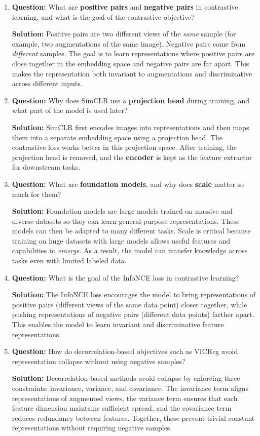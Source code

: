 \documentclass{article}
\begin{document}
\begin{enumerate}
\item \textbf{Question:} 
What are \textbf{positive pairs} and \textbf{negative pairs} in contrastive learning, and what is the goal of the contrastive objective?

\textbf{Solution:}  
Positive pairs are two different views of the \emph{same} sample (for example, two augmentations of the same image). Negative pairs come from \emph{different} samples.  
The goal is to learn representations where positive pairs are close together in the embedding space and negative pairs are far apart. This makes the representation both invariant to augmentations and discriminative across different inputs.

\item \textbf{Question:} 
Why does SimCLR use a \textbf{projection head} during training, and what part of the model is used later?

\textbf{Solution:}  
SimCLR first encodes images into representations and then maps them into a separate embedding space using a projection head. The contrastive loss works better in this projection space.  
After training, the projection head is removed, and the \textbf{encoder} is kept as the feature extractor for downstream tasks.

\item \textbf{Question:} 
What are \textbf{foundation models}, and why does \textbf{scale} matter so much for them?

\textbf{Solution:}  
Foundation models are large models trained on massive and diverse datasets so they can learn general-purpose representations. These models can then be adapted to many different tasks.  
Scale is critical because training on huge datasets with large models allows useful features and capabilities to \emph{emerge}. As a result, the model can transfer knowledge across tasks even with limited labeled data.

\item \textbf{Question:}
What is the goal of the InfoNCE loss in contrastive learning?

\textbf{Solution:}
The InfoNCE loss encourages the model to bring representations of positive pairs (different views of the same data point) closer together, while pushing representations of negative pairs (different data points) farther apart. This enables the model to learn invariant and discriminative feature representations.

\item \textbf{Question:}
How do decorrelation-based objectives such as VICReg avoid representation collapse without using negative samples?

\textbf{Solution:}
Decorrelation-based methods avoid collapse by enforcing three constraints: invariance, variance, and covariance. The invariance term aligns representations of augmented views, the variance term ensures that each feature dimension maintains sufficient spread, and the covariance term reduces redundancy between features. Together, these prevent trivial constant representations without requiring negative samples.

\end{enumerate}
\end{document}
